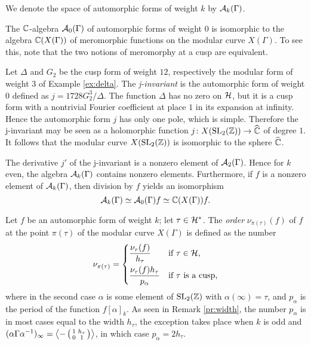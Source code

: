 We denote the space of automorphic forms of weight $k$ by $\mathcal{A}_k(\Gamma)$.

\begin{rmk}
 The $\mathbb{C}$-algebra $\mathcal{A}_0(\Gamma)$ of automorphic forms of weight $0$ is isomorphic to the algebra $\mathbb{C}(X(\Gamma))$ of meromorphic functions on the modular curve $X(\Gamma)$. To see this, note that the two notions of meromorphy at a cusp are equivalent.
\end{rmk}

\begin{expl} \label{ex:j-invariant}
 Let $\Delta$ and $G_2$ be the cusp form of weight $12$, respectively the modular form of weight $3$ of Example \ref{ex:delta}. The \emph{j-invariant} is the automorphic form of weight $0$ defined as $j=1728 G_2^3 / \Delta$. The function $\Delta$ has no zero on $\mathcal{H}$, but it is a cusp form with a nontrivial Fourier coefficient at place $1$ in its expansion at infinity. Hence the automorphic form $j$ has only one pole, which is simple. Therefore the j-invariant may be seen as a holomorphic function $j\colon X(\operatorname{SL}_2(\mathbb{Z})) \to\widehat{\mathbb{C}}$ of degree $1$. It follows that the modular curve $X(\operatorname{SL}_2(\mathbb{Z}))$ is isomorphic to the sphere $\widehat{\mathbb{C}}$.
\end{expl}

\begin{rmk}
 The derivative $j'$ of the j-invariant is a nonzero element of $\mathcal{A}_2(\Gamma)$. Hence for $k$ even, the algebra $\mathcal{A}_k(\Gamma)$ contains nonzero elements. Furthermore, if $f$ is a nonzero element of $\mathcal{A}_k(\Gamma)$, then division by $f$ yields an isomorphism \[\mathcal{A}_k(\Gamma)\simeq\mathcal{A}_0(\Gamma)f\simeq\mathbb{C}(X(\Gamma))f.\]
\end{rmk}

\begin{defi}
 Let $f$ be an automorphic form of weight $k$; let $\tau\in\mathcal{H^*}$. The \emph{order} $\nu_{\pi(\tau)}(f)$ of $f$ at the point $\pi(\tau)$ of the modular curve $X(\Gamma)$ is defined as the number
 \[\nu_{\pi(\tau)}=\begin{dcases*}\frac{\nu_{\tau}(f)}{h_\tau} & if $\tau\in\mc{H}$, \\
                                  \frac{\nu_{\tau}(f)h_\tau}{p_\alpha} & if $\tau$ is a cusp,\end{dcases*}\]
 where in the second case $\alpha$ is some element of $\operatorname{SL}_2(\mathbb{Z})$ with $\alpha(\infty)=\tau$, and $p_\alpha$ is the period of the function $f[\alpha]_k$. As seen in Remark \ref{pr:width}, the number $p_\alpha$ is in most cases equal to the width $h_\tau$, the exception takes place when $k$ is odd and $(\alpha\Gamma\alpha^{-1})_\infty=\left\langle -\left(\begin{smallmatrix}1&h_\tau \\ 0&1\end{smallmatrix}\right) \right\rangle$, in which case $p_\alpha=2h_\tau$.
\end{defi}

